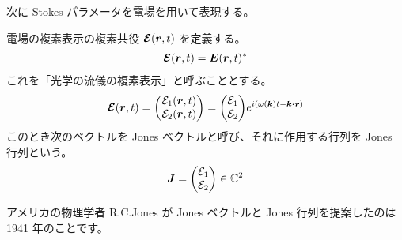\documentclass[uplatex,dvipdfmx,a4paper,11pt]{jlreq}
\newcommand{\CC}{\mathbb{C}}
\newcommand{\EE}{\bm{E}}
\newcommand{\rr}{\bm{r}}
\newcommand{\kk}{\bm{k}}
\theoremstyle{definition}
\begin{document}
次に Stokes パラメータを電場を用いて表現する。
\begin{definition}
  電場の複素表示の複素共役 $\EC(\rr, t)$ を定義する。
  \begin{align}
    \EC(\rr, t) = \EE(\rr, t)^*
  \end{align}
  これを「光学の流儀の複素表示」と呼ぶこととする。
  \begin{align}
    \EC(\rr, t) = \mqty(\Ec_1(\rr, t) \\ \Ec_2(\rr, t)) = \mqty(\Ec_1 \\ \Ec_2)e^{i(\omega(\kk)t - \kk\vdot\rr)}
  \end{align}
  このとき次のベクトルを Jones ベクトルと呼び、それに作用する行列を Jones 行列という。
  \begin{align}
    \JJ = \mqty(\Ec_1 \\ \Ec_2) \in\CC^2
  \end{align}
\end{definition}
アメリカの物理学者 R.C.Jones が Jones ベクトルと Jones 行列を提案したのは 1941 年のことです。
\end{document}
